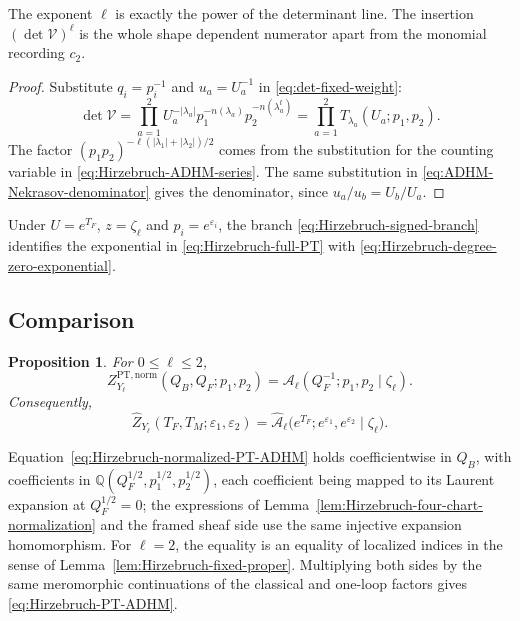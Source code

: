 \documentclass{amsart}
\newtheorem{proposition}{Proposition}
\theoremstyle{definition}
\numberwithin{equation}{section}
\newcommand{\Q}{\mathbb Q}
\newcommand{\cV}{\mathcal V}
\newcommand{\eps}{\varepsilon}
\newcommand{\PT}{\mathrm{PT}}
\begin{document}
The exponent \(\ell\) is exactly the power of the determinant line.  The insertion \((\det\cV)^\ell\) is the whole shape dependent numerator apart from the monomial recording \(c_2\).  

\begin{proof}
Substitute \(q_i=p_i^{-1}\) and \(u_a=U_a^{-1}\) in \eqref{eq:det-fixed-weight}:
\[
 \det\cV
 =\prod_{a=1}^2
 U_a^{-\lvert\lambda_a\rvert}
 p_1^{-n(\lambda_a)}p_2^{-n(\lambda_a^t)}
 =\prod_{a=1}^2T_{\lambda_a}(U_a;p_1,p_2).
\]
The factor \((p_1p_2)^{-\ell(\lvert\lambda_1\rvert+ \lvert\lambda_2\rvert)/2}\) comes from the substitution for the counting variable in \eqref{eq:Hirzebruch-ADHM-series}.  The same substitution in \eqref{eq:ADHM-Nekrasov-denominator} gives the denominator, since \(u_a/u_b=U_b/U_a\).
\end{proof}

Under \(U=e^{T_F}\), \(z=\zeta_\ell\) and \(p_i=e^{\eps_i}\), the branch \eqref{eq:Hirzebruch-signed-branch} identifies the exponential in \eqref{eq:Hirzebruch-full-PT} with \eqref{eq:Hirzebruch-degree-zero-exponential}.

\subsection{Comparison}
\begin{proposition}
\label{prop:Hirzebruch-PT-ADHM}
For \(0\leq\ell\leq2\),
\begin{equation}
 Z_{Y_\ell}^{\PT,\mathrm{norm}}(Q_B,Q_F;p_1,p_2)
 =\mathcal A_\ell
 (Q_F^{-1};p_1,p_2\mid\zeta_\ell).
\label{eq:Hirzebruch-normalized-PT-ADHM}
\end{equation}
Consequently,
\begin{equation}
 \widehat Z_{Y_\ell}(T_F,T_M;\eps_1,\eps_2)
 =\widehat{\mathcal A}_\ell
 \bigl(e^{T_F};e^{\eps_1},e^{\eps_2}\mid\zeta_\ell\bigr).
\label{eq:Hirzebruch-PT-ADHM}
\end{equation}
\end{proposition}

Equation~\eqref{eq:Hirzebruch-normalized-PT-ADHM} holds coefficientwise in \(Q_B\), with coefficients in \(\Q(Q_F^{1/2},p_1^{1/2},p_2^{1/2})\), each coefficient being mapped to its Laurent expansion at \(Q_F^{1/2}=0\); the expressions of Lemma~\ref{lem:Hirzebruch-four-chart-normalization} and the framed sheaf side use the same injective expansion homomorphism.  For \(\ell=2\), the equality is an equality of localized indices in the sense of Lemma~\ref{lem:Hirzebruch-fixed-proper}.  Multiplying both sides by the same meromorphic continuations of the classical and one-loop factors gives \eqref{eq:Hirzebruch-PT-ADHM}.
\end{document}
